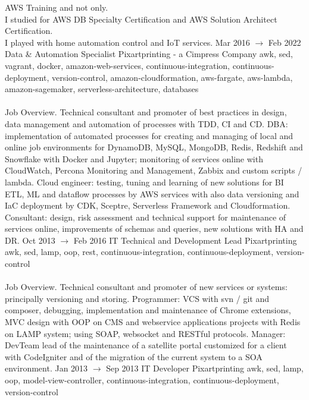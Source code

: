 \documentclass[9pt]{stackoverflow} %
\begin{document}
\begin{tcolorbox}
{\begin{entrylist}
{		AWS Training and not only.\\
		I studied for AWS DB Specialty Certification and AWS Solution Architect Certification.\\
		I played with home automation control and IoT services.}
	\entry
		{Mar 2016 $\rightarrow$ Feb 2022}
		{Data \& Automation Specialist}
		{Pixartprinting - a Cimpress Company}
		{{awk, sed, vagrant, docker, amazon-web-services, continuous-integration, continuous-deployment, version-control, amazon-cloudformation, aws-fargate, aws-lambda, amazon-sagemaker, serverless-architecture, databases}\\\\
		Job Overview. Technical consultant and promoter of best practices in design, data management and automation of processes with TDD, CI and CD.
		DBA: implementation of automated processes for creating and managing of local and online job environments for DynamoDB, MySQL, MongoDB, Redis, Redshift and Snowflake with Docker and Jupyter; monitoring of services online with CloudWatch, Percona Monitoring and Management, Zabbix and custom scripts / lambda.
		Cloud engineer: testing, tuning and learning of new solutions for BI ETL, ML and dataflow processes by AWS services with also data versioning and IaC deployment by CDK, Sceptre, Serverless Framework and Cloudformation.
		Consultant: design, risk assessment and technical support for maintenance of services online, improvements of schemas and queries, new solutions with HA and DR.}
	\entry
		{Oct 2013 $\rightarrow$ Feb 2016}
		{IT Technical and Development Lead}
		{Pixartprinting}
		{{awk, sed, lamp, oop, rest, continuous-integration, continuous-deployment, version-control}\\\\
		Job Overview. Technical consultant and promoter of new services or systems: principally versioning and storing. Programmer:
		VCS with svn / git and composer, debugging, implementation and maintenance of Chrome extensions, MVC design with OOP
		on CMS and webservice applications projects with Redis on LAMP system; using SOAP, websocket and RESTful protocols.
		Manager: DevTeam lead of the maintenance of a satellite portal customized for a client with CodeIgniter and of the migration of
		the current system to a SOA environment.}
	\entry
		{Jan 2013 $\rightarrow$ Sep 2013}
		{IT Developer}
		{Pixartprinting}
		{{awk, sed, lamp, oop, model-view-controller, continuous-integration, continuous-deployment, version-control}\\\\
}
\end{entrylist}}
\end{tcolorbox}
\end{document}
